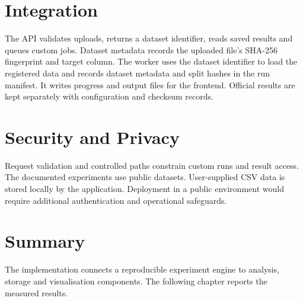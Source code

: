 \section{Integration}
The API validates uploads, returns a dataset identifier, reads saved results and queues custom jobs. Dataset metadata records the uploaded file's SHA-256 fingerprint and target column. The worker uses the dataset identifier to load the registered data and records dataset metadata and split hashes in the run manifest. It writes progress and output files for the frontend. Official results are kept separately with configuration and checksum records.
\section{Security and Privacy}
Request validation and controlled paths constrain custom runs and result access. The documented experiments use public datasets. User-supplied CSV data is stored locally by the application. Deployment in a public environment would require additional authentication and operational safeguards.
\section{Summary}
The implementation connects a reproducible experiment engine to analysis, storage and visualisation components. The following chapter reports the measured results.
